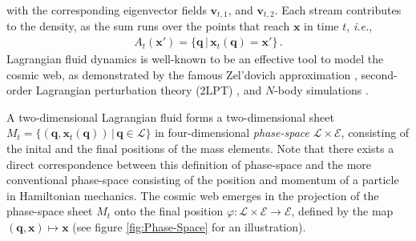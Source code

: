 \documentclass[a4paper, 11pt]{article}
\begin{document}
with the corresponding eigenvector fields $\bm{v}_{t,1}$, and $\bm{v}_{t,2}$. Each stream contributes to the density, as the sum runs over the points that reach $\bm{x}$ in time $t$, \textit{i.e.},
\begin{align}
A_t(\bm{x}') = \{\bm{q}\,|\,\bm{x}_t(\bm{q})=\bm{x}'\}\,.
\end{align} 
Lagrangian fluid dynamics is well-known to be an effective tool to model the cosmic web, as demonstrated by the famous Zel'dovich approximation \cite{Zeldovich:1970}, second-order Lagrangian perturbation theory ($2$LPT) \cite{Buchert:1992, Buchert:1993a, Buchert:1993b, Buchert:1994a, Buchert:1994b, Bouchet:1995}, and $N$-body simulations \cite{Springel:2005, illustris:2014, eagle:2015, ABACUSSUMMIT:2021, Quijote:2020}. 

A two-dimensional Lagrangian fluid forms a two-dimensional sheet $M_t=\{(\bm{q},\bm{x}_t(\bm{q})) \, |\, \bm{q}\in \mathcal{L}\}$ in four-dimensional \textit{phase-space} $\mathcal{L}\times \mathcal{E}$, consisting of the inital and the final positions of the mass elements. Note that there exists a direct correspondence between this definition of phase-space and the more conventional phase-space consisting of the position and momentum of a particle in Hamiltonian mechanics. The cosmic web emerges in the projection of the phase-space sheet $M_t$ onto the final position $\varphi:\mathcal{L}\times \mathcal{E} \to \mathcal{E}$, defined by the map $(\bm{q},\bm{x}) \mapsto\bm{x}$ (see figure \ref{fig:Phase-Space} for an illustration).
\end{document}
